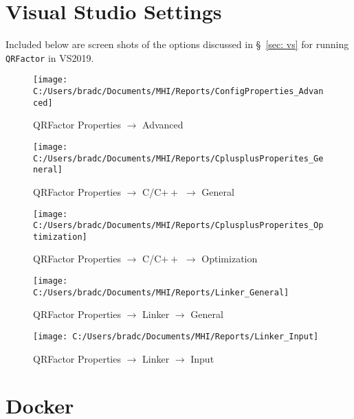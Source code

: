 \documentclass[11pt,letterpaper]{article}
\begin{document}

\appendix

\section{Visual Studio Settings}
\label{app: VS settings}

Included below are screen shots of the options discussed in \S~\!\ref{sec: vs} for
running \verb+QRFactor+ in VS2019.

\begin{figure}[!h]
  \centering
  \texttt{[image: C:/Users/bradc/Documents/MHI/Reports/ConfigProperties\_Advanced]}
  \label{f: configproperties_advanced}
  \caption{QRFactor Properties $\to$ Advanced}
\end{figure}

\begin{figure}[!h]
  \centering
  \texttt{[image: C:/Users/bradc/Documents/MHI/Reports/CplusplusProperites\_General]}
  \caption{QRFactor Properties $\to$ C/C$++$ $\to$ General}
\end{figure}

\begin{figure}[!h]
  \centering
  \texttt{[image: C:/Users/bradc/Documents/MHI/Reports/CplusplusProperites\_Optimization]}
  \caption{QRFactor Properties $\to$ C/C$++$ $\to$ Optimization}
\end{figure}

\begin{figure}[!h]
  \centering
  \texttt{[image: C:/Users/bradc/Documents/MHI/Reports/Linker\_General]}
  \caption{QRFactor Properties $\to$ Linker $\to$ General}
\end{figure}

\begin{figure}[!h]
  \centering
  \texttt{[image: C:/Users/bradc/Documents/MHI/Reports/Linker\_Input]}
  \caption{QRFactor Properties $\to$ Linker $\to$ Input}
\end{figure}


\section{Docker}
\label{app:docker}
\end{document}
